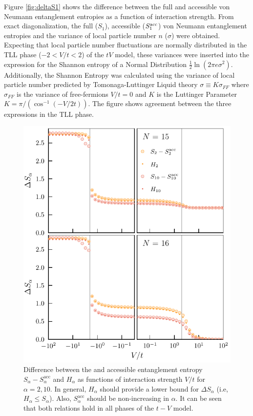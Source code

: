 %
Figure \ref{fig:deltaS1} shows the difference between the full and accessible von Neumann entanglement entropies as a function of interaction strength. From exact diagonalization, the full ($S_1$), accessible ($S_{1}^{\rm acc}$) von Neumann entanglement entropies and the variance of local particle number $n$ ($\sigma$) were obtained. Expecting that local particle number fluctuations are normally distributed in the TLL phase ($-2 < V/t < 2$) of the $tV$ model, these variances were inserted into the expression for the Shannon entropy of a Normal Distribution $\frac{1}{2}\ln{\left( 2\pi e \sigma^2 \right)}$. Additionally, the Shannon Entropy was calculated using the variance of local particle number predicted by Tomonaga-Luttinger Liquid theory $\sigma \equiv K\sigma_{FF}$ where $\sigma_{FF}$ is the variance of free-fermions $V/t = 0$ and $K$ is the Luttinger Parameter $K = \pi/(\cos^{-1}\left( -V/2t \right))$. The figure shows agreement between the three expressions in the TLL phase.


\begin{figure}[htp]
\begin{center}
\includegraphics[width=1.0\columnwidth]{higherAlphaDeltaS_N15N16.pdf}
\end{center}
\caption{Difference between the \ren and accessible entanglement entropy $S_{\alpha} - S_{\alpha}^{\mathrm{acc}}$ and $H_{\alpha}$ as functions of interaction strength $V/t$ for $\alpha=2,10$. In general, $H_{\alpha}$ should provide a lower bound for $\Delta S_{\alpha}$ (i.e, $H_{\alpha} \leq S_{\alpha}$). Also, $S_{\alpha}^{\mathrm{acc}}$ should be non-increasing in $\alpha$. It can be seen that both relations hold in all phases of the $t-V$ model.}
\label{fig:deltaS_alpha}
\end{figure}

